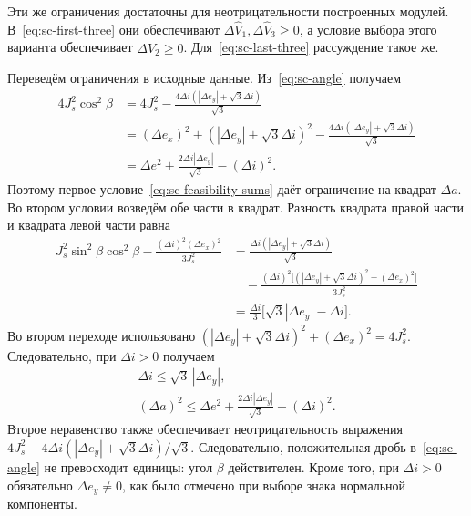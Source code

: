 Эти же ограничения достаточны для неотрицательности построенных
модулей. В~\eqref{eq:sc-first-three} они обеспечивают
$\Delta\widehat V_1,\Delta\widehat V_3\geq0$, а условие выбора
этого варианта обеспечивает $\Delta\widehat V_2\geq0$.
Для~\eqref{eq:sc-last-three} рассуждение такое же.

Переведём ограничения в исходные данные.
Из~\eqref{eq:sc-angle} получаем
\[
 \begin{aligned}
 4J_s^2\cos^2\beta
 &=4J_s^2-\frac{4\Delta i(|\Delta e_y|+\sqrt3\Delta i)}{\sqrt3}\\
 &=(\Delta e_x)^2+(|\Delta e_y|+\sqrt3\Delta i)^2
       -\frac{4\Delta i(|\Delta e_y|+\sqrt3\Delta i)}{\sqrt3}\\
 &=\Delta e^2+\frac{2\Delta i|\Delta e_y|}{\sqrt3}-(\Delta i)^2.
 \end{aligned}
\]
Поэтому первое условие~\eqref{eq:sc-feasibility-sums} даёт
ограничение на квадрат $\Delta a$.
Во втором условии возведём обе части в квадрат.
Разность квадрата правой части и квадрата левой части равна
\[
\begin{aligned}
 J_s^2\sin^2\beta\cos^2\beta
       -\frac{(\Delta i)^2(\Delta e_x)^2}{3J_s^2}
 &=\frac{\Delta i(|\Delta e_y|+\sqrt3\Delta i)}{\sqrt3}\\
 &\quad-\frac{(\Delta i)^2
       \bigl[(|\Delta e_y|+\sqrt3\Delta i)^2+(\Delta e_x)^2\bigr]}
                         {3J_s^2}\\
 &=\frac{\Delta i}{3}\bigl[\sqrt3|\Delta e_y|-\Delta i\bigr].
\end{aligned}
\]
Во втором переходе использовано
$(|\Delta e_y|+\sqrt3\Delta i)^2+(\Delta e_x)^2=4J_s^2$.
Следовательно, при $\Delta i>0$ получаем
\begin{equation}
 \boxed{\begin{gathered}
 \Delta i\leq\sqrt3\,|\Delta e_y|,\\
 (\Delta a)^2\leq\Delta e^2+
          \frac{2\Delta i|\Delta e_y|}{\sqrt3}-(\Delta i)^2.
 \end{gathered}}
 \label{eq:sc-region}
\end{equation}
Второе неравенство также обеспечивает неотрицательность выражения
$4J_s^2-4\Delta i(|\Delta e_y|+\sqrt3\Delta i)/\sqrt3$.
Следовательно, положительная дробь в~\eqref{eq:sc-angle}
не превосходит единицы: угол $\beta$ действителен.
Кроме того, при $\Delta i>0$ обязательно $\Delta e_y\ne0$,
как было отмечено при выборе знака нормальной компоненты.

